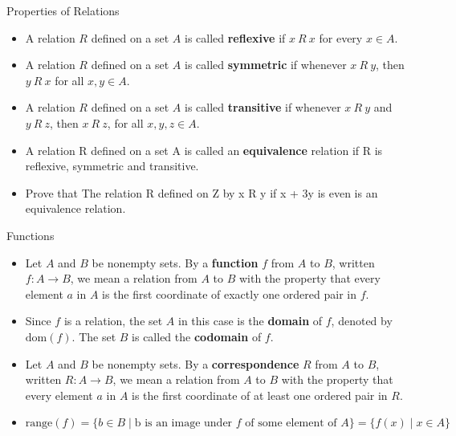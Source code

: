 \documentclass{beamer}
\begin{document}
\begin{frame}{Properties of Relations}
    \begin{itemize}
    \item A relation $R$ defined on a set $A$ is called \textbf{reflexive} if $x \ R \ x$ for every $x \in A$.
    \item A relation $R$ defined on a set $A$ is called \textbf{symmetric} if whenever $x \ R \ y$, then $y \ R \ x$ for all $x, y \in A$.
    \item A relation $R$ defined on a set $A$ is called \textbf{transitive} if whenever $x \ R \ y$ and $y \ R \ z$, then $x \ R \ z$, for all $x, y, z \in A$.
    \item A relation R deﬁned on a set A is called an \textbf{equivalence} relation if R is reﬂexive, symmetric and transitive.
    \item Prove that The relation R deﬁned on Z by x R y if x + 3y is even is an equivalence relation.
    \end{itemize}
\end{frame}

\begin{frame}{Functions}
    \begin{itemize}
    \item Let $A$ and $B$ be nonempty sets. By a \textbf{function} $f$ from $A$ to $B$, written $f: A \rightarrow B$, we mean a relation from $A$ to $B$ with the property that every element $a$ in $A$ is the first coordinate of exactly one ordered pair in $f$.
    \item Since $f$ is a relation, the set $A$ in this case is the \textbf{domain} of $f$, denoted by $\text{dom}(f)$. The set $B$ is called the \textbf{codomain} of $f$.
    \item Let $A$ and $B$ be nonempty sets. By a \textbf{correspondence} $R$ from $A$ to $B$, written $R: A \rightarrow B$, we mean a relation from $A$ to $B$ with the property that every element $a$ in $A$ is the first coordinate of at least one ordered pair in $R$.
    \item $\text{range}(f) = \{b \in B \mid \text{b is an image under } f \text{ of some element of } A\} = \{f(x) \mid x \in A\}$
    \end{itemize}
\end{frame}
\end{document}
